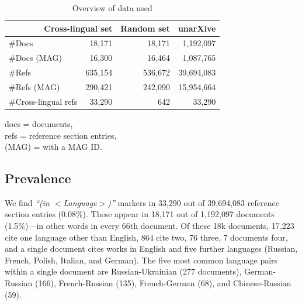 \begin{table}
\caption{Overview of data used}
 \label{tab:dataused}
  \centering
  \begin{small}
 \begin{threeparttable}
 \begin{tabular}{lrrr}
 \toprule
   \multicolumn{2}{r}{Cross-lingual set} & Random set & unarXive \\
   \midrule
   \#Docs & 18,171 & 18,171 & 1,192,097 \\
   \#Docs (MAG) & 16,300 & 16,464 & 1,087,765 \\
   \#Refs & 635,154 & 536,672 & 39,694,083 \\
   \#Refs (MAG) & 290,421 & 242,090 & 15,954,664 \\
   \#Cross-lingual refs & 33,290 & 642 & 33,290 \\
   \bottomrule
 \end{tabular}
 \begin{tablenotes}
    \item *docs  =  documents,\\\hphantom{*}refs  =  reference section entries,\\\hphantom{*}(MAG) = with a MAG ID.
  \end{tablenotes}
\end{threeparttable}
  \end{small}
\end{table}

\subsection{Prevalence}

We find \textit{``(in $<$Language$>$)''} markers in 33,290 out of 39,694,083 reference section entries (0.08\%). These appear in 18,171 out of 1,192,097 documents (1.5\%)---in other words in every 66th document. Of these 18k documents, 17,223 cite one language other than English, 864 cite two, 76 three, 7 documents four, and a single document cites works in English and five further languages (Russian, French, Polish, Italian, and German). The five most common language pairs within a single document are Russian-Ukrainian (277 documents), German-Russian (166), French-Russian (135), French-German (68), and Chinese-Russian (59).

